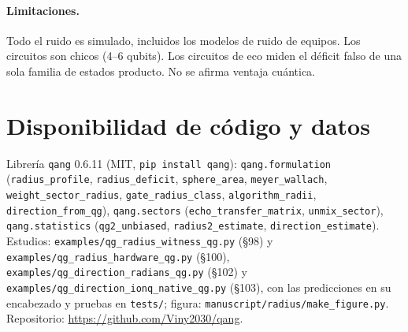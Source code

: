 \documentclass[11pt]{article}
\begin{document}
\paragraph{Limitaciones.} Todo el ruido es simulado, incluidos los modelos de ruido de equipos. Los circuitos son
chicos (4--6 qubits). Los circuitos de eco miden el déficit falso de una sola familia de estados producto. No se afirma
ventaja cuántica.

\section*{Disponibilidad de código y datos}
{\raggedright
Librería \texttt{qang} 0.6.11 (MIT, \texttt{pip install qang}): \texttt{qang.formulation} (\texttt{radius\_profile},
\texttt{radius\_deficit}, \texttt{sphere\_area}, \texttt{meyer\_wallach}, \texttt{weight\_sector\_radius},
\texttt{gate\_radius\_class}, \texttt{algorithm\_radii}, \texttt{direction\_from\_qg}), \texttt{qang.sectors} (\texttt{echo\_transfer\_matrix},
\texttt{unmix\_sector}), \texttt{qang.statistics}
(\texttt{qg2\_unbiased}, \texttt{radius2\_estimate}, \texttt{direction\_estimate}). Estudios: \texttt{examples/qg\_radius\_witness\_qg.py} (\S98) y
\texttt{examples/qg\_radius\_hardware\_qg.py} (\S100), \texttt{examples/qg\_direction\_radians\_qg.py} (\S102) y
\texttt{examples/qg\_direction\_ionq\_native\_qg.py} (\S103), con las predicciones en su encabezado y pruebas en
\texttt{tests/}; figura: \texttt{manuscript/radius/make\_figure.py}. Repositorio: \url{https://github.com/Viny2030/qang}.\par}



\end{document}

